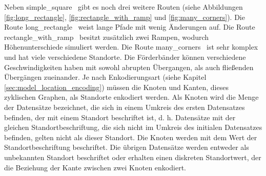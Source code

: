 \newline
\newline
Neben \glqq simple\_square \grqq\ gibt es noch drei weitere Routen (siehe Abbildungen \ref{fig:long_rectangle}, \ref{fig:rectangle_with_ramp} und \ref{fig:many_corners}).
Die Route \glqq long\_rectangle \grqq\ weist lange Pfade mit wenig Änderungen auf.
Die Route \glqq rectangle\_with\_ramp \grqq\ besitzt zusätzlich zwei Rampen, wodurch Höhenunterschiede simuliert werden.
Die Route \glqq many\_corners \grqq\ ist sehr komplex und hat viele verschiedene Standorte.
Die Förderbänder können verschiedene Geschwindigkeiten haben mit sowohl abrupten Übergangen, als auch fließenden Übergängen zueinander.
\newline
\newline
Je nach Enkodierungsart (siehe Kapitel \ref{sec:model_location_encoding}) müssen die Knoten und Kanten, dieses zyklischen Graphen, als Standorte enkodiert werden.
Als Knoten wird die Menge der Datensätze bezeichnet, die sich in einem Umkreis des ersten Datensatzes befinden, der mit einem Standort beschriftet ist,
d. h. Datensätze mit der gleichen Standortbeschriftung, die sich nicht im Umkreis des initialen Datensatzes befinden, gelten nicht als dieser Standort.
Die Knoten werden mit dem Wert der Standortbeschriftung beschriftet.
Die übrigen Datensätze werden entweder als unbekannten Standort beschriftet oder erhalten einen diskreten Standortwert, der die Beziehung der Kante zwischen zwei Knoten enkodiert.